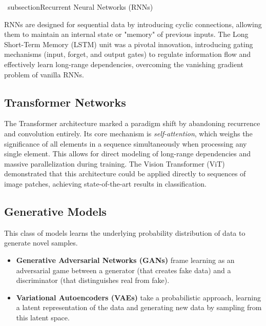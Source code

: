 \documentclass[10pt, conference]{IEEEtran}
\begin{document}
\ subsection{Recurrent Neural Networks (RNNs)}

 RNNs are designed for sequential data by introducing cyclic connections,
 allowing them to maintain an internal state or "memory" of previous
 inputs. The Long Short-Term Memory (LSTM) unit \cite{hochreiter1997long}
 was a pivotal innovation, introducing gating mechanisms (input, forget,
 and output gates) to regulate information flow and effectively learn
 long-range dependencies, overcoming the vanishing gradient problem of
 vanilla RNNs.

\subsection{Transformer Networks}

 The Transformer architecture \cite{vaswani2017attention} marked
 a paradigm shift by abandoning recurrence and convolution entirely. Its
 core mechanism is \textit{self-attention}, which weighs the significance
 of all elements in a sequence simultaneously when processing any single
 element. This allows for direct modeling of long-range dependencies and
 massive parallelization during training. The Vision Transformer (ViT)
 \cite{dosovitskiy2020image} demonstrated that this architecture could be
 applied directly to sequences of image patches, achieving
 state-of-the-art results in classification.

\subsection{Generative Models}

 This class of models learns the underlying probability distribution of
 data to generate novel samples. 

\begin{itemize}

   \item \textbf{Generative Adversarial Networks (GANs)}
       \cite{goodfellow2014generative} frame learning as an adversarial game
       between a generator (that creates fake data) and a discriminator
       (that distinguishes real from fake).

   \item \textbf{Variational Autoencoders (VAEs)} \cite{kingma2013auto}
       take a probabilistic approach, learning a latent representation of
       the data and generating new data by sampling from this latent space.

\end{itemize}
\end{document}
